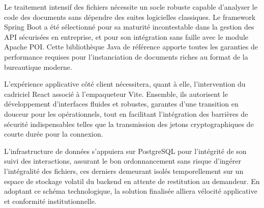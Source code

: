 \documentclass[11pt,a4paper]{article}
\begin{document}
Le traitement intensif des fichiers nécessite un socle robuste capable d'analyser le code des documents sans dépendre des suites logicielles classiques. Le framework Spring Boot a été sélectionné pour sa maturité incontestable dans la gestion des API sécurisées en entreprise, et pour son intégration sans faille avec le module Apache POI. Cette bibliothèque Java de référence apporte toutes les garanties de performance requises pour l'instanciation de documents riches au format de la bureautique moderne. 

L'expérience applicative côté client nécessitera, quant à elle, l'intervention du cadriciel React associé à l'empaqueteur Vite. Ensemble, ils autorisent le développement d'interfaces fluides et robustes, garantes d'une transition en douceur pour les opérationnels, tout en facilitant l'intégration des barrières de sécurité indispensables telles que la transmission des jetons cryptographiques de courte durée pour la connexion.

L'infrastructure de données s'appuiera sur PostgreSQL pour l'intégrité de son suivi des interactions, assurant le bon ordonnancement sans risque d'ingérer l'intégralité des fichiers, ces derniers demeurant isolés temporellement sur un espace de stockage volatil du backend en attente de restitution au demandeur. En adoptant ce schéma technologique, la solution finalisée alliera vélocité applicative et conformité institutionnelle.
\end{document}
